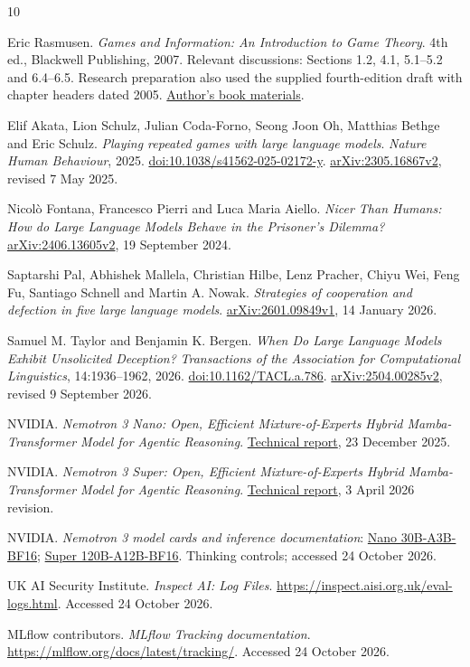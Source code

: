 \documentclass[11pt,a4paper]{article}
\begin{document}
\begin{thebibliography}{10}
\raggedright
{}
Eric Rasmusen. \emph{Games and Information: An Introduction to Game Theory}.
4th ed., Blackwell Publishing, 2007. Relevant discussions: Sections 1.2, 4.1,
5.1--5.2 and 6.4--6.5. Research preparation also used the supplied fourth-edition
draft with chapter headers dated 2005.
\href{https://rasmusen.org/GI/}{Author's book materials}.

Elif Akata, Lion Schulz, Julian Coda-Forno, Seong Joon Oh, Matthias Bethge and
Eric Schulz. \emph{Playing repeated games with large language models}.
\emph{Nature Human Behaviour}, 2025.
\href{https://doi.org/10.1038/s41562-025-02172-y}{doi:10.1038/s41562-025-02172-y}.
\href{https://arxiv.org/abs/2305.16867v2}{arXiv:2305.16867v2}, revised 7 May 2025.

Nicol\`o Fontana, Francesco Pierri and Luca Maria Aiello.
\emph{Nicer Than Humans: How do Large Language Models Behave in the Prisoner's Dilemma?}
\href{https://arxiv.org/abs/2406.13605v2}{arXiv:2406.13605v2}, 19 September 2024.

Saptarshi Pal, Abhishek Mallela, Christian Hilbe, Lenz Pracher, Chiyu Wei,
Feng Fu, Santiago Schnell and Martin A. Nowak.
\emph{Strategies of cooperation and defection in five large language models}.
\href{https://arxiv.org/abs/2601.09849v1}{arXiv:2601.09849v1}, 14 January 2026.

Samuel M. Taylor and Benjamin K. Bergen.
\emph{When Do Large Language Models Exhibit Unsolicited Deception?}
\emph{Transactions of the Association for Computational Linguistics},
14:1936--1962, 2026. \href{https://doi.org/10.1162/TACL.a.786}{doi:10.1162/TACL.a.786}.
\href{https://arxiv.org/abs/2504.00285v2}{arXiv:2504.00285v2}, revised 9 September 2026.

NVIDIA. \emph{Nemotron 3 Nano: Open, Efficient Mixture-of-Experts Hybrid
Mamba-Transformer Model for Agentic Reasoning}.
\href{https://research.nvidia.com/labs/nemotron/files/NVIDIA-Nemotron-3-Nano-Technical-Report.pdf}{Technical report}, 23 December 2025.

NVIDIA. \emph{Nemotron 3 Super: Open, Efficient Mixture-of-Experts Hybrid
Mamba-Transformer Model for Agentic Reasoning}.
\href{https://research.nvidia.com/labs/nemotron/files/NVIDIA-Nemotron-3-Super-Technical-Report.pdf}{Technical report}, 3 April 2026 revision.

NVIDIA. \emph{Nemotron 3 model cards and inference documentation}:
\href{https://huggingface.co/nvidia/NVIDIA-Nemotron-3-Nano-30B-A3B-BF16}{Nano 30B-A3B-BF16};
\href{https://huggingface.co/nvidia/NVIDIA-Nemotron-3-Super-120B-A12B-BF16}{Super 120B-A12B-BF16}.
Thinking controls; accessed 24 October 2026.

UK AI Security Institute. \emph{Inspect AI: Log Files}.
\url{https://inspect.aisi.org.uk/eval-logs.html}. Accessed 24 October 2026.

MLflow contributors. \emph{MLflow Tracking documentation}.
\url{https://mlflow.org/docs/latest/tracking/}. Accessed 24 October 2026.
\end{thebibliography}
\end{document}
